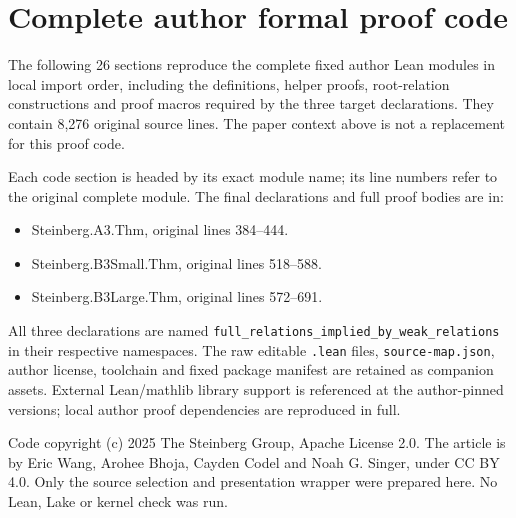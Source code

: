 \clearpage
\section*{Complete author formal proof code}
\noindent The following 26 sections reproduce the complete fixed author Lean modules in local import order, including the definitions, helper proofs, root-relation constructions and proof macros required by the three target declarations. They contain 8,276 original source lines. The paper context above is not a replacement for this proof code.
\par\medskip
\noindent Each code section is headed by its exact module name; its line numbers refer to the original complete module. The final declarations and full proof bodies are in:
\begin{itemize}
\item Steinberg.A3.Thm, original lines 384--444.
\item Steinberg.B3Small.Thm, original lines 518--588.
\item Steinberg.B3Large.Thm, original lines 572--691.
\end{itemize}
\noindent All three declarations are named \texttt{full\_relations\_implied\_by\_weak\_relations} in their respective namespaces. The raw editable \texttt{.lean} files, \texttt{source-map.json}, author license, toolchain and fixed package manifest are retained as companion assets. External Lean/mathlib library support is referenced at the author-pinned versions; local author proof dependencies are reproduced in full.
\par\medskip
\noindent Code copyright (c) 2025 The Steinberg Group, Apache License 2.0. The article is by Eric Wang, Arohee Bhoja, Cayden Codel and Noah G. Singer, under CC BY 4.0. Only the source selection and presentation wrapper were prepared here. No Lean, Lake or kernel check was run.
